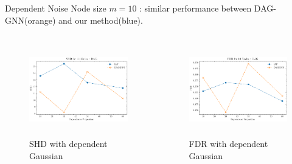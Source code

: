\documentclass{beamer}
\begin{document}
\begin{frame}[allowframebreaks]{Dependent Noise}
    Node size $m=10$ : similar performance between DAG-GNN(orange) and our method(blue).
    \begin{columns}
        \begin{column}{0.5\textwidth}
            \begin{figure}
                \centering
                \includegraphics[height=4cm]{fig/SHD_dependence_10_DAG_threshold0.3.pdf}
                \caption{SHD with dependent Gaussian}
                \label{fig:dep_gaussian_shd_10}
            \end{figure}
        \end{column}
        \begin{column}{0.5\textwidth}
            \begin{figure}
                \centering
                \includegraphics[height=4cm]{fig/FDR_dependence_10_DAG_threshold0.3.pdf}
                \caption{FDR with dependent Gaussian}
                \label{fig:dep_gaussian_fdr_10}
            \end{figure}
        \end{column}
    \end{columns}
    \framebreak


\end{frame}
\end{document}
